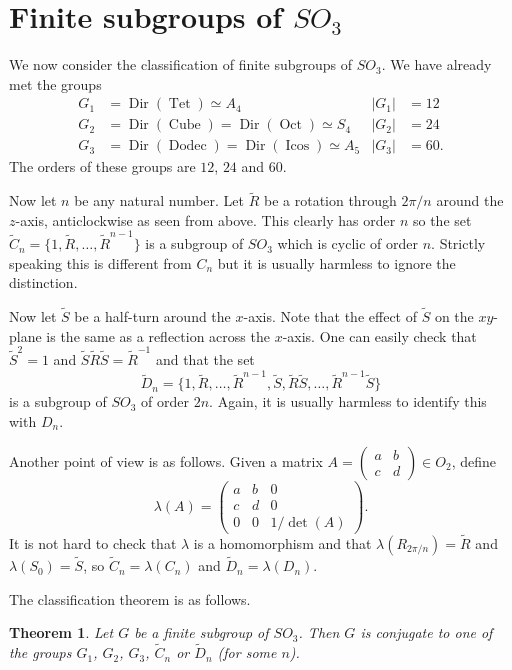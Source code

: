\documentclass{amsart}
\DeclareMathOperator{\Tet}      {Tet}
\DeclareMathOperator{\Cube}     {Cube}
\DeclareMathOperator{\Oct}      {Oct}
\DeclareMathOperator{\Dodec}    {Dodec}
\DeclareMathOperator{\Icos}     {Icos}
\DeclareMathOperator{\Dir}      {Dir}
\newcommand{\bsm}       {\left(\begin{smallmatrix}}
\newcommand{\esm}       {\end{smallmatrix}\right)}
\newcommand{\tC}        {\widetilde{C}}
\newcommand{\tD}        {\widetilde{D}}
\newcommand{\tR}        {\widetilde{R}}
\newcommand{\tS}        {\widetilde{S}}
\newcommand{\lm}        {\lambda}
\renewcommand{\:}{\colon}
\newtheorem{theorem}{Theorem}[section]
\theoremstyle{definition}
\begin{document}
\section{Finite subgroups of $SO_3$}

We now consider the classification of finite subgroups of $SO_3$.  We
have already met the groups
\begin{align*}
 G_1 &= \Dir(\Tet)\simeq A_4               & |G_1| &= 12 \\
 G_2 &= \Dir(\Cube)=\Dir(\Oct)\simeq S_4   & |G_2| &= 24 \\
 G_3 &= \Dir(\Dodec)=\Dir(\Icos)\simeq A_5 & |G_3| &= 60.
\end{align*}
The orders of these groups are $12$, $24$ and $60$.

Now let $n$ be any natural number.  Let $\tR$ be a rotation through
$2\pi/n$ around the $z$-axis, anticlockwise as seen from above.  This
clearly has order $n$ so the set $\tC_n=\{1,\tR,\ldots,\tR^{n-1}\}$ is
a subgroup of $SO_3$ which is cyclic of order $n$.  Strictly speaking
this is different from $C_n$ but it is usually harmless to ignore the
distinction.

Now let $\tS$ be a half-turn around the $x$-axis.  Note that the
effect of $\tS$ on the $xy$-plane is the same as a reflection across
the $x$-axis.  One can easily check that $\tS^2=1$ and
$\tS\tR\tS=\tR^{-1}$ and that the set
\[ \tD_n=\{1,\tR,\ldots,\tR^{n-1},\tS,\tR\tS,\ldots,\tR^{n-1}\tS\} \]
is a subgroup of $SO_3$ of order $2n$.  Again, it is usually harmless
to identify this with $D_n$.

Another point of view is as follows.  Given a matrix
$A=\bsm a&b\\c&d\esm\in O_2$, define
\[ \lm(A) = \left(\begin{array}{cc|c}
   a & b & 0 \\ c & d & 0 \\ \hline 0 & 0 & 1/\det(A)
   \end{array}\right).
\]
It is not hard to check that $\lm$ is a homomorphism and that
$\lm(R_{2\pi/n})=\tR$ and $\lm(S_0)=\tS$, so $\tC_n=\lm(C_n)$ and
$\tD_n=\lm(D_n)$.

The classification theorem is as follows.
\begin{theorem}
 Let $G$ be a finite subgroup of $SO_3$.  Then $G$ is conjugate to one
 of the groups $G_1$, $G_2$, $G_3$, $\tC_n$ or $\tD_n$ (for some $n$).
\end{theorem}
\end{document}
